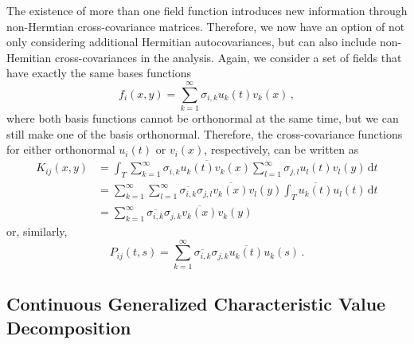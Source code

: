 \documentclass[10pt]{article}
\newcommand{\norm}[1]{\left\Vert#1\right\Vert}
\begin{document}
The existence of more than one field function introduces new information through non-Hermtian cross-covariance matrices.
Therefore, we now have an option of not only considering additional Hermitian autocovariances, but can also include non-Hemitian cross-covariances in the analysis.
Again, we consider a set of fields that have exactly the same bases functions
\begin{equation}
	f_i(x,y) = \sum_{k=1}^\infty \sigma_{i,k} u_k(t) v_k(x)\,,
\end{equation}
where both basis functions cannot be orthonormal at the same time, but we can still make one of the basis orthonormal.
Therefore, the cross-covariance functions for either orthonormal $u_i(t)$ or $v_i(x)$, respectively, can be written as
\begin{equation}
\begin{aligned}
	K_{ij}(x,y) 
	& =  
	\int_T 
	\sum_{k=1}^\infty \overline{\sigma_{i,k} u_{k}(t)v_{k}(x)} 
	\sum_{l=1}^\infty \sigma_{j,l} u_{l}(t) v_{l}(y)\, \mathrm{d} t\\
	& =  
	\sum_{k=1}^\infty \sum_{l=1}^\infty 
	\overline{\sigma_{i,k}}\sigma_{j,l}\overline{v_{k}(x)} v_{l}(y)
	\int_T 
	\overline{ u_{k}(t)} 
	u_{l}(t)\, \mathrm{d} t\\
	& =  
	\sum_{k=1}^\infty 
	\overline{\sigma_{i,k}}\sigma_{j,k}\overline{v_{k}(x)} v_{k}(y)
\end{aligned}
\end{equation}
or, similarly,
\begin{equation}
	P_{ij}(t,s) =  
	\sum_{k=1}^\infty 
	\overline{\sigma_{i,k}}\sigma_{j,k}\overline{u_{k}(t)} u_{k}(s)\,.
\end{equation}
\subsection{Continuous Generalized Characteristic Value Decomposition}
\end{document}
